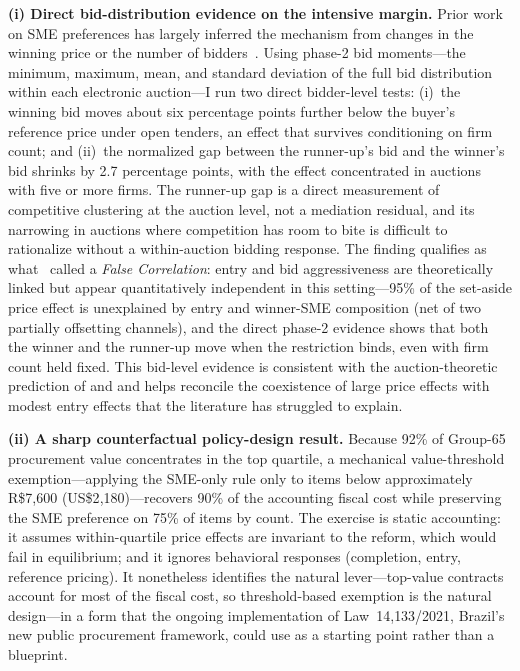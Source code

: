 \noindent\textbf{(i) Direct bid-distribution evidence on the intensive margin.} Prior work on SME preferences has largely inferred the mechanism from changes in the winning price or the number of bidders~\citep{marion2007, athey2013, krasnokutskaya2011, nakabayashi2013}. Using phase-2 bid moments---the minimum, maximum, mean, and standard deviation of the full bid distribution within each electronic auction---I run two direct bidder-level tests: (i)~the winning bid moves about six percentage points further below the buyer's reference price under open tenders, an effect that survives conditioning on firm count; and (ii)~the normalized gap between the runner-up's bid and the winner's bid shrinks by 2.7 percentage points, with the effect concentrated in auctions with five or more firms. The runner-up gap is a direct measurement of competitive clustering at the auction level, not a mediation residual, and its narrowing in auctions where competition has room to bite is difficult to rationalize without a within-auction bidding response. The finding qualifies as what~\citet{davis1971} called a \emph{False Correlation}: entry and bid aggressiveness are theoretically linked but appear quantitatively independent in this setting---95\% of the set-aside price effect is unexplained by entry and winner-SME composition (net of two partially offsetting channels), and the direct phase-2 evidence shows that both the winner and the runner-up move when the restriction binds, even with firm count held fixed. This bid-level evidence is consistent with the auction-theoretic prediction of \citet{bulow1996} and \citet{krasnokutskaya2011} and helps reconcile the coexistence of large price effects with modest entry effects that the literature has struggled to explain.

\noindent\textbf{(ii) A sharp counterfactual policy-design result.} Because 92\% of Group-65 procurement value concentrates in the top quartile, a mechanical value-threshold exemption---applying the SME-only rule only to items below approximately R\$7{,}600 (US\$2{,}180)---recovers 90\% of the accounting fiscal cost while preserving the SME preference on 75\% of items by count. The exercise is static accounting: it assumes within-quartile price effects are invariant to the reform, which would fail in equilibrium; and it ignores behavioral responses (completion, entry, reference pricing). It nonetheless identifies the natural lever---top-value contracts account for most of the fiscal cost, so threshold-based exemption is the natural design---in a form that the ongoing implementation of Law~14{,}133/2021, Brazil's new public procurement framework, could use as a starting point rather than a blueprint.

